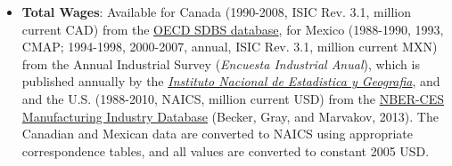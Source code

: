 \begin{spacing}{1}
\begin{itemize}
	\item \textbf{Total Wages}: Available for Canada (1990-2008, ISIC Rev. 3.1, million current CAD) from the \href{http://stats.oecd.org/index.aspx?queryid=224}{OECD SDBS database}, for Mexico (1988-1990, 1993, CMAP; 1994-1998, 2000-2007, annual, ISIC Rev. 3.1, million current MXN) from the Annual Industrial Survey (\emph{Encuesta Industrial Anual}), which is published annually by   the \href{http://buscador.inegi.org.mx/search?q=encuesta+industrial+anual&client=ProductosR&proxystylesheet=ProductosR&num=10&getfields=*&sort=meta:edicion:D:E:::D&entsp=a__inegi_politica_p72&lr=lang_es\%7Clang_en&oe=UTF-8&ie=UTF-8&ip=10.210.100.253&entqr=3&filter=0&site=ProductosBuscador&tlen=260&ulang=en&start=0}{\emph{Instituto Nacional de Estadistica y Geografia}}, and and the U.S. (1988-2010, NAICS, million current USD) from the \href{http://www.nber.org/nberces/}{NBER-CES Manufacturing Industry Database} (Becker, Gray, and Marvakov, 2013). The Canadian and Mexican data are converted to NAICS using appropriate correspondence tables, and all values are converted to constant 2005 USD. 
		
	\end{itemize}	

\end{spacing}
